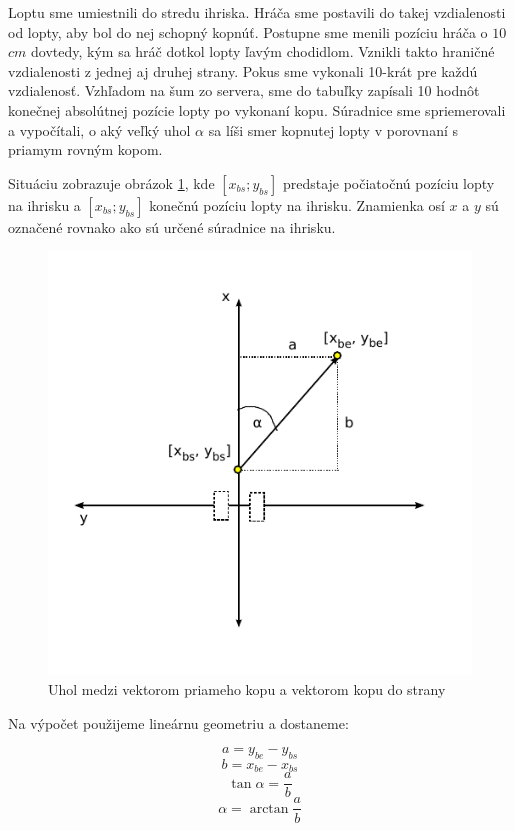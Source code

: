 Loptu sme umiestnili do stredu ihriska. Hráča sme postavili do takej vzdialenosti od lopty, aby bol do nej schopný kopnúť. Postupne sme menili pozíciu hráča o $10$ $cm$ dovtedy, kým sa hráč dotkol lopty ľavým chodidlom. Vznikli takto hraničné vzdialenosti z jednej aj druhej strany. Pokus sme vykonali 10-krát pre každú vzdialenosť. Vzhľadom na šum zo servera, sme do tabuľky zapísali 10 hodnôt konečnej absolútnej pozície lopty po vykonaní kopu. Súradnice sme spriemerovali a vypočítali, o aký veľký uhol $\alpha$ sa líši smer kopnutej lopty v porovnaní s priamym rovným kopom.

Situáciu zobrazuje obrázok \ref{pic_alpha}, kde $[x_{bs};y_{bs}]$ predstaje počiatočnú pozíciu lopty na ihrisku a $[x_{bs};y_{bs}]$ konečnú pozíciu lopty na ihrisku. Znamienka osí $x$ a $y$ sú označené rovnako ako sú určené súradnice na ihrisku.

\begin{figure}[H]
  \center
  \includegraphics[scale=1]{./data/alpha}
  \caption{Uhol medzi vektorom priameho kopu a vektorom kopu do strany}
  \label{pic_alpha}
\end{figure}

Na výpočet použijeme lineárnu geometriu a dostaneme:

$$a = y_{be}-y_{bs}$$
$$b = x_{be}-x_{bs}$$
$$\tan \alpha = \frac{a}{b}$$
$$\alpha = \arctan{\frac{a}{b}} $$

